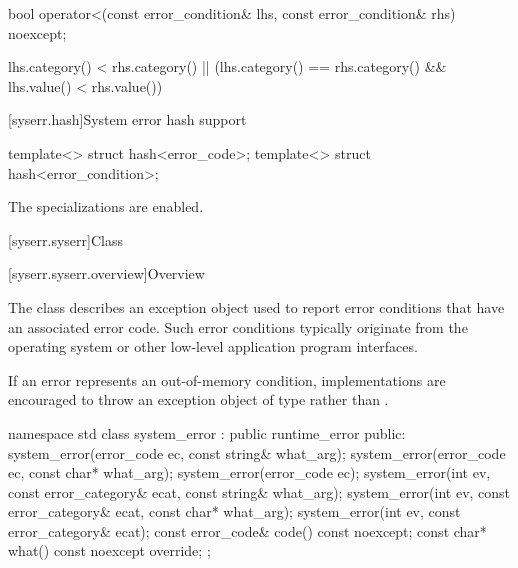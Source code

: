 %
\begin{itemdecl}
bool operator<(const error_condition& lhs, const error_condition& rhs) noexcept;
\end{itemdecl}

\begin{itemdescr}
\pnum
\returns
\begin{codeblock}
lhs.category() < rhs.category() ||
(lhs.category() == rhs.category() && lhs.value() < rhs.value())
\end{codeblock}
\end{itemdescr}

[syserr.hash]{System error hash support}

%
\begin{itemdecl}
template<> struct hash<error_code>;
template<> struct hash<error_condition>;
\end{itemdecl}

\begin{itemdescr}
\pnum The specializations are enabled.
\end{itemdescr}

[syserr.syserr]{Class }

[syserr.syserr.overview]{Overview}

\pnum
The class  describes an exception object used to
report error conditions that have an associated error code. Such error
conditions typically originate from the operating system or other low-level
application program interfaces.

\pnum
\begin{note}
If an error represents an out-of-memory condition, implementations are
encouraged to throw an exception object of type  rather
than .
\end{note}
%
\begin{codeblock}
namespace std {
  class system_error : public runtime_error {
  public:
    system_error(error_code ec, const string& what_arg);
    system_error(error_code ec, const char* what_arg);
    system_error(error_code ec);
    system_error(int ev, const error_category& ecat, const string& what_arg);
    system_error(int ev, const error_category& ecat, const char* what_arg);
    system_error(int ev, const error_category& ecat);
    const error_code& code() const noexcept;
    const char* what() const noexcept override;
  };
}
\end{codeblock}

